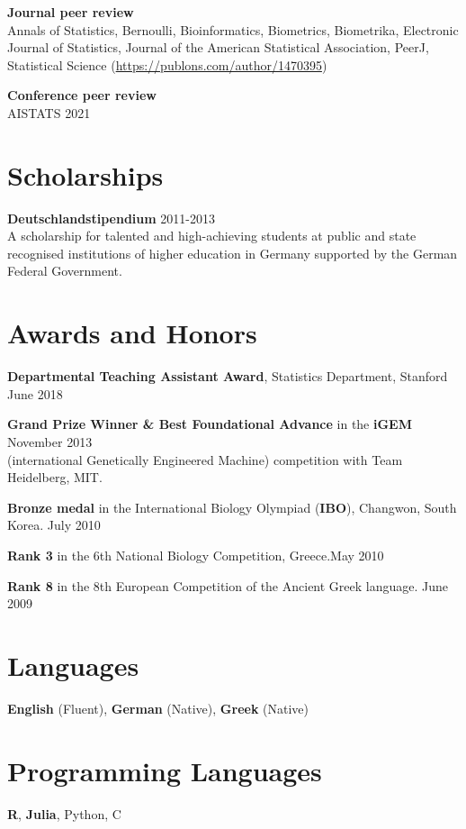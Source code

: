 \documentclass[margin,line]{res}
\newcommand{\ver}{\vspace*{-2.7mm}}
\begin{document}
\begin{resume}
\textbf{Journal peer review}\\
Annals of Statistics, Bernoulli, Bioinformatics, Biometrics, Biometrika, Electronic Journal of Statistics, Journal of the American Statistical Association, PeerJ, Statistical Science (\url{https://publons.com/author/1470395})

\ver
\textbf{Conference peer review}\\
AISTATS 2021


\section{\sc Scholarships}


\textbf{Deutschlandstipendium} \hfill 2011-2013\\
A scholarship for talented and high-achieving students at public and state recognised institutions of higher education in Germany supported by the German Federal Government.


\section{\sc Awards and Honors}
\textbf{Departmental Teaching Assistant Award}, Statistics Department, Stanford \hfill June 2018

\textbf{Grand Prize Winner \& Best Foundational Advance} in the \textbf{iGEM} \hfill November 2013 \\
(international Genetically Engineered Machine) competition with Team Heidelberg, MIT.

\ver
\textbf{Bronze medal} in the International Biology Olympiad (\textbf{IBO}), Changwon, South Korea. \hfill July 2010

\ver
\textbf{Rank 3} in the 6th National Biology Competition, Greece.\hfill May 2010
\ver

\textbf{Rank 8} in the 8th European Competition of the Ancient Greek language. \hfill June 2009




\section{\sc Languages}
\textbf{English} (Fluent), \textbf{German} (Native), \textbf{Greek} (Native)


\section{\sc Programming Languages}
\textbf{R}, \textbf{Julia}, Python, C



\end{resume}
\end{document}
